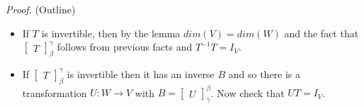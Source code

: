 \documentclass[12pt]{article}
\begin{document}
\textit{Proof.} (Outline)
\begin{itemize}
    \item If $T$ is invertible, then by the lemma $dim(V) = dim(W)$ and the fact that $\begin{bmatrix} T \end{bmatrix}_\beta^\gamma$ follows from previous facts and $T^{-1}T = I_V$.
    
    \item If $\begin{bmatrix} T \end{bmatrix}_\beta^\gamma$ is invertible then it has an inverse $B$ and so there is a transformation $U : W \to V$ with $B = \begin{bmatrix} U \end{bmatrix}_\gamma^\beta$. Now check that $UT = I_V$. 
\end{itemize}
\end{document}

